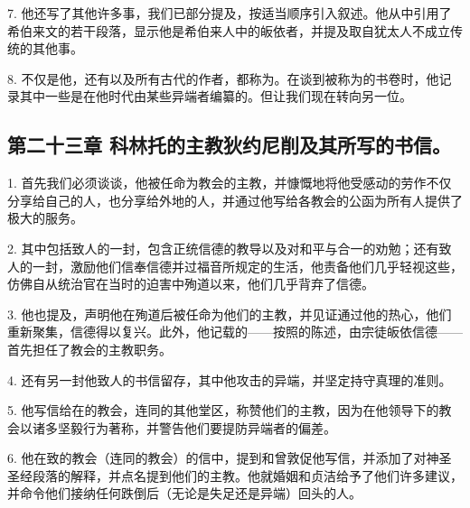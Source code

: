 7. 他还写了其他许多事，我们已部分提及，按适当顺序引入叙述。他从中引用了希伯来文的若干段落，显示他是希伯来人中的皈依者，并提及取自犹太人不成立传统的其他事。\par

8. 不仅是他，还有以及所有古代的作者，都称为。在谈到被称为的书卷时，他记录其中一些是在他时代由某些异端者编纂的。但让我们现在转向另一位。\par


\subsection{第二十三章 科林托的主教狄约尼削及其所写的书信。}

1. 首先我们必须谈谈，他被任命为教会的主教，并慷慨地将他受感动的劳作不仅分享给自己的人，也分享给外地的人，并通过他写给各教会的公函为所有人提供了极大的服务。\par

2. 其中包括致人的一封，包含正统信德的教导以及对和平与合一的劝勉；还有致人的一封，激励他们信奉信德并过福音所规定的生活，他责备他们几乎轻视这些，仿佛自从统治官在当时的迫害中殉道以来，他们几乎背弃了信德。\par

3. 他也提及，声明他在殉道后被任命为他们的主教，并见证通过他的热心，他们重新聚集，信德得以复兴。此外，他记载的——按照的陈述，由宗徒皈依信德——首先担任了教会的主教职务。\par

4. 还有另一封他致人的书信留存，其中他攻击的异端，并坚定持守真理的准则。\par

5. 他写信给在的教会，连同的其他堂区，称赞他们的主教，因为在他领导下的教会以诸多坚毅行为著称，并警告他们要提防异端者的偏差。\par

6. 他在致的教会（连同的教会）的信中，提到和曾敦促他写信，并添加了对神圣圣经段落的解释，并点名提到他们的主教。他就婚姻和贞洁给予了他们许多建议，并命令他们接纳任何跌倒后（无论是失足还是异端）回头的人。\par

